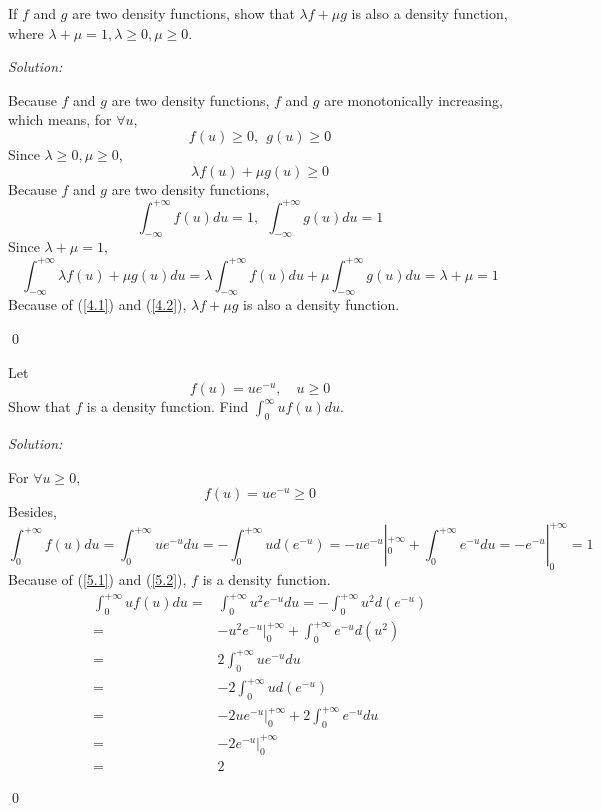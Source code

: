 \documentclass[12pt]{article}
\newenvironment{problem}[2][Problem]{\begin{trivlist}
\item[\hskip \labelsep {\bfseries #1}\hskip \labelsep {\bfseries #2.}]}{\end{trivlist}}
\newenvironment{sol}
    {\emph{Solution:}
    }
    {
    \qed
    }
\begin{document}
\begin{problem}{4}
If $f$ and $g$ are two density functions, show that $\lambda f+\mu g$ is also a density function, where $\lambda+\mu=1, \lambda\geq 0, \mu \geq 0$.
\end{problem}
\begin{sol}
Because $f$ and $g$ are two density functions, $f$ and $g$ are monotonically increasing, which means, for $\forall u$,
\[
f(u)\geq0,~~g(u)\geq0
\]
Since $\lambda\geq0,\mu\geq0$,
\begin{equation}
\label{4.1}
\lambda f(u)+\mu g(u)\geq0
\end{equation}
Because $f$ and $g$ are two density functions,
\[
\int_{-\infty}^{+\infty}f(u)du=1,~~\int_{-\infty}^{+\infty}g(u)du=1
\]
Since $\lambda+\mu=1$,
\begin{equation}
\label{4.2}
\int_{-\infty}^{+\infty}\lambda f(u)+\mu g(u)du=\lambda\int_{-\infty}^{+\infty}f(u)du+\mu\int_{-\infty}^{+\infty}g(u)du=\lambda+\mu=1
\end{equation}
Because of (\ref{4.1}) and (\ref{4.2}), $\lambda f+\mu g$ is also a density function.
\end{sol}



\begin{problem}{5}
Let \[
f(u)=ue^{-u}, \quad u\geq 0
\]
Show that $f$ is a density function. Find $\int_0^{\infty} uf(u) du$.
\end{problem}
\begin{sol}
For $\forall u\geq0$,
\begin{equation}
\label{5.1}
f(u)=ue^{-u}\geq0
\end{equation}
Besides,
\begin{equation}
\label{5.2}
\int_{0}^{+\infty}f(u)du=\int_{0}^{+\infty}ue^{-u}du=-\int_{0}^{+\infty}ud(e^{-u})=-ue^{-u}|_0^{+\infty}+\int_0^{+\infty}e^{-u}du=-e^{-u}|_0^{+\infty}=1
\end{equation}
Because of (\ref{5.1}) and (\ref{5.2}), $f$ is a density function.
\begin{align*}
\int_0^{+\infty}uf(u)du=&\int_0^{+\infty}u^2e^{-u}du=-\int_0^{+\infty}u^2d(e^{-u})\\
=&-u^2e^{-u}|_0^{+\infty}+\int_0^{+\infty}e^{-u}d(u^2)\\
=&2\int_0^{+\infty}ue^{-u}du\\
=&-2\int_0^{+\infty}ud(e^{-u})\\
=&-2ue^{-u}|_0^{+\infty}+2\int_0^{+\infty}e^{-u}du\\
=&-2e^{-u}|_0^{+\infty}\\
=&2
\end{align*}
\end{sol}
\end{document}
